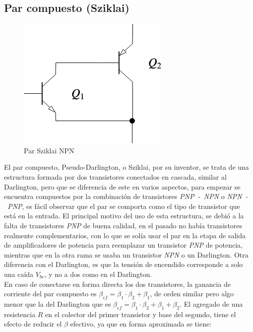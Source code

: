 
\subsection{Par compuesto (Sziklai)}


\begin{figure}
\begin{center}
\includegraphics[width=0.48 \textwidth, angle=0]{./img/sziklai/sziklai0.png}
\end{center}
\caption{\label{fig:fig_sziklai_cir_0}\footnotesize{Par Sziklai NPN}}
\end{figure}

El par compuesto, Pseudo-Darlington, o Sziklai, por su inventor, se trata de una estructura formada por dos transistores conectados en cascada, similar al Darlington, pero que se diferencia de este en varios aspectos, para empezar se encuentra compuestos por la combinación de transistores \textit{PNP~-~NPN} o \textit{NPN~-~PNP}, es fácil observar que el par se comporta como el tipo de transistor que está en la entrada. El principal motivo del uso de esta estructura, se debió a la falta de transistores \textit{PNP} de buena calidad, en el pasado no había transistores realmente complementarios, con lo que se solía usar el par en la etapa de salida de amplificadores de potencia para reemplazar un transistor \textit{PNP} de potencia, mientras que en la otra rama se usaba un transistor \textit{NPN} o un Darlington. Otra diferencia con el Darlington, es que la tensión de encendido corresponde a solo una caída $V_{be}$, y no a dos como en el Darlington.\\
En caso de conectarse en forma directa los dos transistores, la ganancia de corriente del par compuesto es $\beta_{ef} = \beta_{1} \cdot \beta_{2} + \beta_{1}$, de orden similar pero algo menor que la del Darlington que es $\beta_{ef} = \beta_{1} \cdot \beta_{2} + \beta_{1} + \beta_{2}$. El agregado de una resistencia $R$ en el colector del primer transistor y base del segundo, tiene el efecto de reducir el $\beta$ efectivo, ya que en forma aproximada se tiene:


